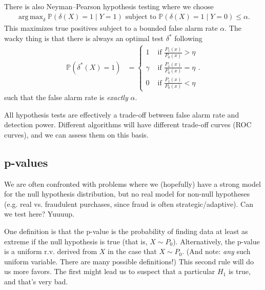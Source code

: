 \documentclass[11pt,letterpaper]{article}
\DeclareMathOperator*{\argmax}{arg\,max}
\theoremstyle{definition}
\theoremstyle{plain}
\numberwithin{equation}{section}
\numberwithin{figure}{section}
\begin{document}
There is also Neyman--Pearson hypothesis testing where we choose
%
\begin{align}
	\argmax_\delta \mathbb{P}(\delta(X) = 1 \mid Y=1) \text{ subject to } \mathbb{P}(\delta(X)=1\mid Y=0) \leq \alpha.
\end{align}
%
This maximizes true positives subject to a bounded false alarm rate $\alpha$. The wacky thing is that there is always an optimal test $\delta^\ast$ following
%
\begin{align}
	\mathbb{P}(\delta^\ast(X) =1) &= \left\{\begin{array}{lr}
		1 & \text{ if } \frac{P_1(x)}{P_0(x)} > \eta\\
		\gamma & \text{ if } \frac{P_1(x)}{P_0(x)} = \eta\\
		0 & \text{ if } \frac{P_1(x)}{P_0(x)} < \eta
	\end{array}\right..
\end{align}
%
such that the false alarm rate is \emph{exactly} $\alpha$.

All hypothesis tests are effectively a trade-off between false alarm rate and detection power. Different algorithms will have different trade-off curves (ROC curves), and we can assess them on this basis.














\subsection{p-values}
We are often confronted with problems where we (hopefully) have a strong model for the null hypothesis distribution, but no real model for non-null hypotheses (e.g. real vs. fraudulent purchases, since fraud is often strategic/adaptive). Can we test here? Yuuuup.



One definition is that the p-value is the probability of finding data at least as extreme if the null hypothesis is true (that is, $X \sim P_0$). Alternatively, the p-value is a uniform r.v. derived from $X$ in the case that $X \sim P_0$. (And note: \emph{any} such uniform variable. There are many possible definitions!) This second rule will do us more favors. The first might lead us to suspect that a particular $H_1$ is true, and that's very bad.
\end{document}
